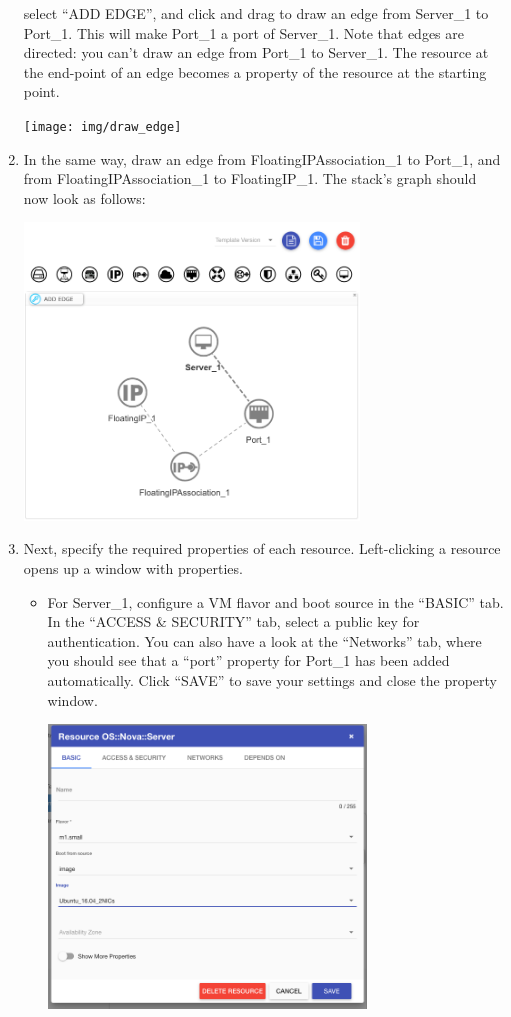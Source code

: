 \begin{enumerate}
  select ``ADD EDGE'', and click and drag to draw an edge from
  Server\_1 to Port\_1.  This will make Port\_1 a port of Server\_1.
  Note that edges are directed: you can't draw an edge from Port\_1 to
  Server\_1.  The resource at the end-point of an edge becomes a
  property of the resource at the starting point.
  \begin{center}
    \texttt{[image: img/draw\_edge]}
  \end{center}
\item In the same way, draw an edge from FloatingIPAssociation\_1 to
  Port\_1, and from FloatingIPAssociation\_1 to FloatingIP\_1.  The
  stack's graph should now look as follows:
  \begin{center}
    \includegraphics[width=0.7\textwidth]{img/all_resources_connected}
  \end{center}
\item Next, specify the required properties of each resource.
  Left-clicking a resource opens up a window with properties.
  \begin{itemize}
  \item For Server\_1, configure a VM flavor and boot source in the
    ``BASIC'' tab.  In the ``ACCESS \& SECURITY'' tab, select a public
    key for authentication.  You can also have a look at the
    ``Networks'' tab, where you should see that a ``port'' property
    for Port\_1 has been added automatically.  Click ``SAVE'' to save
    your settings and close the property window.
    \begin{center}
      \includegraphics[width=0.7\textwidth]{img/server_basic_properties}

\end{center}
\end{itemize}
\end{enumerate}
